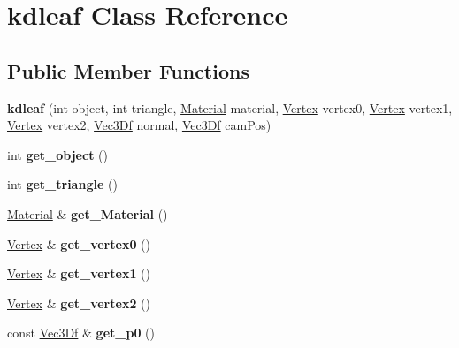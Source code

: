 \hypertarget{classkdleaf}{
\section{kdleaf Class Reference}
\label{classkdleaf}
}
\subsection*{Public Member Functions}
\begin{DoxyCompactItemize}
\item 
\hypertarget{classkdleaf_a61f8dc444b059efc74a8407ea22c64b6}{
{\bfseries kdleaf} (int object, int triangle, \hyperlink{class_material}{Material} material, \hyperlink{class_vertex}{Vertex} vertex0, \hyperlink{class_vertex}{Vertex} vertex1, \hyperlink{class_vertex}{Vertex} vertex2, \hyperlink{class_vec3_d}{Vec3Df} normal, \hyperlink{class_vec3_d}{Vec3Df} camPos)}
\label{classkdleaf_a61f8dc444b059efc74a8407ea22c64b6}

\item 
\hypertarget{classkdleaf_a21e06e09640a9d8142874916b98a37a9}{
int {\bfseries get\_\-object} ()}
\label{classkdleaf_a21e06e09640a9d8142874916b98a37a9}

\item 
\hypertarget{classkdleaf_a3d9647e804925ed89db806d6dcbd61bc}{
int {\bfseries get\_\-triangle} ()}
\label{classkdleaf_a3d9647e804925ed89db806d6dcbd61bc}

\item 
\hypertarget{classkdleaf_a37dd9e3906892e5fe500ef483d70f915}{
\hyperlink{class_material}{Material} \& {\bfseries get\_\-Material} ()}
\label{classkdleaf_a37dd9e3906892e5fe500ef483d70f915}

\item 
\hypertarget{classkdleaf_a54a1ee1595eef900d154b2e1311c75ff}{
\hyperlink{class_vertex}{Vertex} \& {\bfseries get\_\-vertex0} ()}
\label{classkdleaf_a54a1ee1595eef900d154b2e1311c75ff}

\item 
\hypertarget{classkdleaf_a8e59b65dc9de0d6c4d26f3658388497f}{
\hyperlink{class_vertex}{Vertex} \& {\bfseries get\_\-vertex1} ()}
\label{classkdleaf_a8e59b65dc9de0d6c4d26f3658388497f}

\item 
\hypertarget{classkdleaf_afe839295836ac154b0c6cc953c487148}{
\hyperlink{class_vertex}{Vertex} \& {\bfseries get\_\-vertex2} ()}
\label{classkdleaf_afe839295836ac154b0c6cc953c487148}

\item 
\hypertarget{classkdleaf_a22bd977d3771ad4c1cd2e44e51583ed3}{
const \hyperlink{class_vec3_d}{Vec3Df} \& {\bfseries get\_\-p0} ()}
\label{classkdleaf_a22bd977d3771ad4c1cd2e44e51583ed3}


\end{DoxyCompactItemize}
